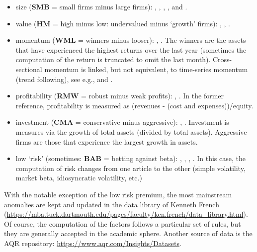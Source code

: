 \documentclass[]{krantz}
\providecommand{\tightlist}{%
  \setlength{\itemsep}{0pt}\setlength{\parskip}{0pt}}
\theoremstyle{definition}
\theoremstyle{definition}
\theoremstyle{definition}
\theoremstyle{remark}
\begin{document}
\begin{itemize}
\tightlist
\item
  size (\textbf{SMB} = small firms minus large firms):
  \citet{banz1981relationship}, \citet{fama1992cross},
  \citet{fama1993common}, \citet{van2011size}, \citet{asness2018size}
  and \citet{astakhov2019firm}.\\
\item
  value (\textbf{HM} = high minus low: undervalued minus `growth'
  firms): \citet{fama1992cross}, \citet{fama1993common},
  \citet{asness2013value}.\\
\item
  momentum (\textbf{WML} = winners minus looser):
  \citet{jegadeesh1993returns}, \citet{asness2013value}. The winners are
  the assets that have experienced the highest returns over the last
  year (sometimes the computation of the return is truncated to omit the
  last month). Cross-sectional momentum is linked, but not equivalent,
  to time-series momentum (trend following), see e.g.,
  \citet{moskowitz2012time} and \citet{lemperiere2014two}.\\
\item
  profitability (\textbf{RMW} = robust minus weak profits):
  \citet{fama2015five}, \citet{bouchaud2019sticky}. In the former
  reference, profitability is measured as (revenues - (cost and
  expenses))/equity.\\
\item
  investment (\textbf{CMA} = conservative minus aggressive):
  \citet{fama2015five}, \citet{hou2015digesting}. Investment is measures
  via the growth of total assets (divided by total assets). Aggressive
  firms are those that experience the largest growth in assets.\\
\item
  low `risk' (sometimes: \textbf{BAB} = betting against beta):
  \citet{ang2006cross}, \citet{baker2011benchmarks},
  \citet{frazzini2014betting}, \citet{boloorforoosh2019beta}. In this
  case, the computation of risk changes from one article to the other
  (simple volatility, market beta, idiosyncratic volatility, etc.)
\end{itemize}

With the notable exception of the low risk premium, the most mainstream
anomalies are kept and updated in the data library of Kenneth French
(\url{https://mba.tuck.dartmouth.edu/pages/faculty/ken.french/data_library.html}).
Of course, the computation of the factors follows a particular set of
rules, but they are generally accepted in the academic sphere. Another
source of data is the AQR repository:
\url{https://www.aqr.com/Insights/Datasets}.
\end{document}
